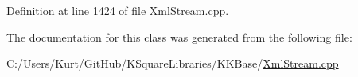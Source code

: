 Definition at line 1424 of file Xml\+Stream.\+cpp.



The documentation for this class was generated from the following file\+:\begin{DoxyCompactItemize}
\item 
C\+:/\+Users/\+Kurt/\+Git\+Hub/\+K\+Square\+Libraries/\+K\+K\+Base/\hyperlink{_xml_stream_8cpp}{Xml\+Stream.\+cpp}\end{DoxyCompactItemize}
